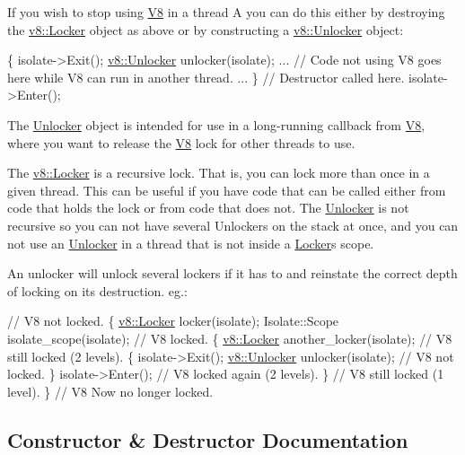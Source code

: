 If you wish to stop using \hyperlink{classv8_1_1_v8}{V8} in a thread A you can do this either by destroying the \hyperlink{classv8_1_1_locker}{v8\+::\+Locker} object as above or by constructing a \hyperlink{classv8_1_1_unlocker}{v8\+::\+Unlocker} object\+:


\begin{DoxyCode}
\{
  isolate->Exit();
  \hyperlink{classv8_1_1_unlocker}{v8::Unlocker} unlocker(isolate);
  ...
  \textcolor{comment}{// Code not using V8 goes here while V8 can run in another thread.}
  ...
\} \textcolor{comment}{// Destructor called here.}
isolate->Enter();
\end{DoxyCode}


The \hyperlink{classv8_1_1_unlocker}{Unlocker} object is intended for use in a long-\/running callback from \hyperlink{classv8_1_1_v8}{V8}, where you want to release the \hyperlink{classv8_1_1_v8}{V8} lock for other threads to use.

The \hyperlink{classv8_1_1_locker}{v8\+::\+Locker} is a recursive lock. That is, you can lock more than once in a given thread. This can be useful if you have code that can be called either from code that holds the lock or from code that does not. The \hyperlink{classv8_1_1_unlocker}{Unlocker} is not recursive so you can not have several Unlockers on the stack at once, and you can not use an \hyperlink{classv8_1_1_unlocker}{Unlocker} in a thread that is not inside a \hyperlink{classv8_1_1_locker}{Locker}\textquotesingle{}s scope.

An unlocker will unlock several lockers if it has to and reinstate the correct depth of locking on its destruction. eg.\+:


\begin{DoxyCode}
\textcolor{comment}{// V8 not locked.}
\{
  \hyperlink{classv8_1_1_locker}{v8::Locker} locker(isolate);
  Isolate::Scope isolate\_scope(isolate);
  \textcolor{comment}{// V8 locked.}
  \{
    \hyperlink{classv8_1_1_locker}{v8::Locker} another\_locker(isolate);
    \textcolor{comment}{// V8 still locked (2 levels).}
    \{
      isolate->Exit();
      \hyperlink{classv8_1_1_unlocker}{v8::Unlocker} unlocker(isolate);
      \textcolor{comment}{// V8 not locked.}
    \}
    isolate->Enter();
    \textcolor{comment}{// V8 locked again (2 levels).}
  \}
  \textcolor{comment}{// V8 still locked (1 level).}
\}
\textcolor{comment}{// V8 Now no longer locked.}
\end{DoxyCode}
 

\subsection{Constructor \& Destructor Documentation}
\hypertarget{classv8_1_1_unlocker_a1512a9d4ecd680f2176fea176052256f}{}
